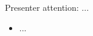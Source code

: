 \begin{highlightframe}{Presenter attention: ...}
	\begin{itemize}
		\item ...
	\end{itemize}
\end{highlightframe}

